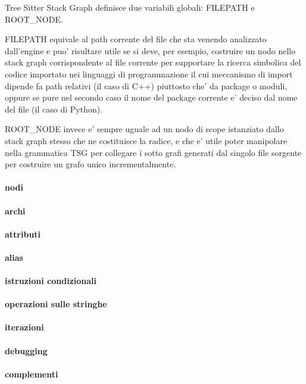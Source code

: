 Tree Sitter Stack Graph definisce due variabili globali: FILEPATH e ROOT_NODE.

FILEPATH equivale al path corrente del file che sta venendo analizzato dall'engine e puo' risultare utile se si deve, per esempio, costruire un nodo nello stack graph corrispondente al file corrente per supportare la ricerca simbolica del codice importato nei linguaggi di programmazione il cui meccanismo di import dipende fa path relativi (il caso di C++) piuttosto che' da package o moduli, oppure se pure nel secondo caso il nome del package corrente e' deciso dal nome del file (il caso di Python).

ROOT_NODE invece e' sempre uguale ad un nodo di scope istanziato dallo stack graph stesso che ne costituisce la radice, e che e' utile poter manipolare nella grammatica TSG per collegare i sotto grafi generati dal singolo file sorgente per costruire un grafo unico incrementalmente.

\paragraph{nodi}

\paragraph{archi}

\paragraph{attributi}

\paragraph{alias}

\paragraph{istruzioni condizionali}

\paragraph{operazioni sulle stringhe}

\paragraph{iterazioni}

\paragraph{debugging}

\paragraph{complementi}
